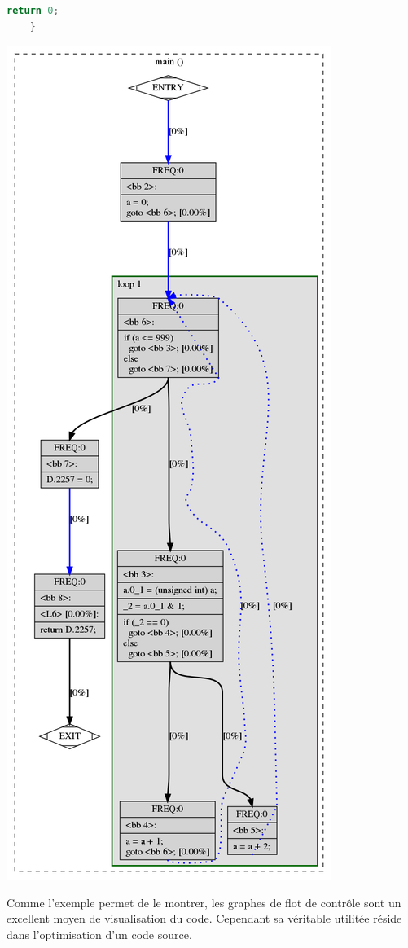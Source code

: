 \begin{multicols}{2}
\begin{lstlisting}[language=c]
        return 0;
    }
\end{lstlisting}
\begin{center}
    \includegraphics[scale=0.22]{images/graph.png}
\end{center}
\end{multicols}
Comme l'exemple permet de le montrer, les graphes de flot de contrôle sont un excellent moyen de visualisation du code. Cependant sa véritable utilitée réside dans l'optimisation d'un code source.

